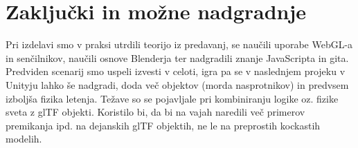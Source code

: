 \documentclass[a4paper]{article}
\begin{document}
\section{Zaključki in možne nadgradnje} %
Pri izdelavi smo v praksi utrdili teorijo iz predavanj, se naučili uporabe WebGL-a in senčilnikov, naučili osnove Blenderja ter nadgradili znanje JavaScripta in gita. Predviden scenarij smo uspeli izvesti v celoti, igra pa se v naslednjem projeku v Unityju lahko še nadgradi, doda več objektov (morda nasprotnikov) in predvsem izboljša fizika letenja. Težave so se pojavljale pri kombiniranju logike oz. fizike sveta z glTF objekti. Koristilo bi, da bi na vajah naredili več primerov premikanja ipd. na dejanskih glTF objektih, ne le na preprostih kockastih modelih. 

\small

%
\end{document}
